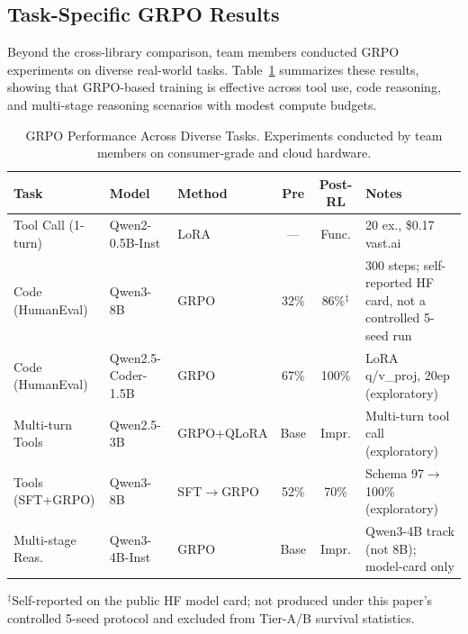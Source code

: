 \documentclass{article}
\begin{document}
\subsection{Task-Specific GRPO Results}
\label{sec:task_grpo}

Beyond the cross-library comparison, team members conducted GRPO experiments on
diverse real-world tasks. Table~\ref{tab:task_grpo} summarizes these results,
showing that GRPO-based training is effective across tool use, code reasoning,
and multi-stage reasoning scenarios with modest compute budgets.

\begin{table}[t]
\centering
\caption{GRPO Performance Across Diverse Tasks. Experiments conducted by team members
on consumer-grade and cloud hardware.}
\label{tab:task_grpo}
\footnotesize
\begin{tabular}{@{}l l l c c p{2.8cm}@{}}
\toprule
\textbf{Task} & \textbf{Model} & \textbf{Method} & \textbf{Pre} & \textbf{Post-RL} & \textbf{Notes} \\
\midrule
Tool Call (1-turn) & Qwen2-0.5B-Inst & LoRA & --- & Func. & 20 ex., \$0.17 vast.ai \\
Code (HumanEval) & Qwen3-8B & GRPO & 32\% & 86\%$^{\ddagger}$ & 300 steps; self-reported HF card, not a controlled 5-seed run \\
Code (HumanEval) & Qwen2.5-Coder-1.5B & GRPO & 67\% & 100\% & LoRA q/v\_proj, 20ep (exploratory) \\
Multi-turn Tools & Qwen2.5-3B & GRPO+QLoRA & Base & Impr. & Multi-turn tool call (exploratory) \\
Tools (SFT+GRPO) & Qwen3-8B & SFT$\to$GRPO & 52\% & 70\% & Schema 97$\to$100\% (exploratory) \\
Multi-stage Reas. & Qwen3-4B-Inst & GRPO & Base & Impr. & Qwen3-4B track (not 8B); model-card only \\
\bottomrule
\end{tabular}

\vspace{2pt}
{\scriptsize $^{\ddagger}$Self-reported on the public HF model card; not produced under this paper's controlled 5-seed protocol and excluded from Tier-A/B survival statistics.}

\end{table}
\end{document}
